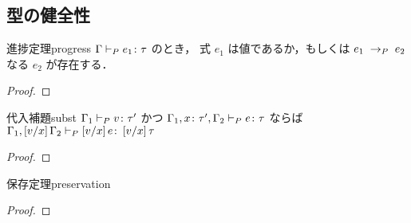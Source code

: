\subsection{型の健全性}
\label{sec:type:soundness}

\begin{theorem}{進捗定理}{progress}
  $\TyJudge{P}{\Gamma}{e_1}{\tau}$ のとき，
  式 $e_1$ は値であるか，もしくは $\Reduce{P}{e_1}{e_2}$ なる $e_2$ が存在する．
\end{theorem}
\begin{proof}
\end{proof}

\begin{lemma}{代入補題}{subst}
  $\TyJudge{P}{\Gamma_1}{v}{\tau'}$ かつ
  $\TyJudge{P}{\Gamma_1, \typed{x}{\tau'}, \Gamma_2}{e}{\tau}$ ならば
  $\TyJudge{P}{\Gamma_1, \subst{v}{x}{\Gamma_2}}{\subst{v}{x}{e}}{\subst{v}{x}{\tau}}$
\end{lemma}
\begin{proof}
\end{proof}

\begin{theorem}{保存定理}{preservation}
\end{theorem}
\begin{proof}
\end{proof}
